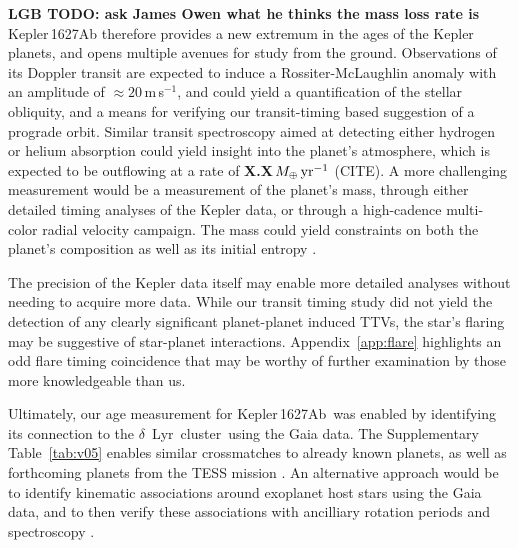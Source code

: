 \documentclass[12pt,modern,tighten]{aastex63}
\newcommand{\cn}{$\delta$~Lyr\ cluster} %
\newcommand{\pn}{Kepler\,1627Ab} %
\newcommand{\ms}{\,m\,s$^{-1}$}
\begin{document}


{\bf LGB TODO: ask James Owen what he thinks the mass loss rate is}
Kepler\,1627Ab therefore provides a new extremum in the ages of the
Kepler planets, and opens multiple avenues for study from the ground.
Observations of its Doppler transit are expected to induce a
Rossiter-McLaughlin anomaly with an amplitude of $\approx 20$\ms, and
could yield a quantification of the stellar obliquity, and a means for
verifying our transit-timing based suggestion of a prograde orbit.
Similar transit spectroscopy aimed at detecting either hydrogen or
helium absorption could yield insight into the planet's atmosphere,
which is expected to be outflowing at a rate of {\bf
X.X}\,$M_\oplus\,{\rm yr}^{-1}$ (CITE).  A more challenging
measurement would be a measurement of the planet's mass, through
either detailed timing analyses of the Kepler data, or through a
high-cadence multi-color radial velocity campaign.  The mass could
yield constraints on both the planet's composition as well as its
initial entropy \citep{owen_constraining_2020}.

The precision of the Kepler data itself may enable more detailed
analyses without needing to acquire more data.  While our transit
timing study did not yield the detection of any clearly significant
planet-planet induced TTVs, the star's flaring may be suggestive of
star-planet interactions.  Appendix~\ref{app:flare} highlights an odd flare
timing coincidence that may be worthy of further examination by those
more knowledgeable than us.

Ultimately, our age measurement for \pn\ was enabled by identifying
its connection to the \cn\ using the Gaia data.  The Supplementary
Table~\ref{tab:v05} enables similar crossmatches to already known
planets, as well as forthcoming planets from the TESS mission
\citep{ricker_transiting_2015,guerrero_tess_2021}.  An alternative
approach would be to identify kinematic associations around exoplanet
host stars using the Gaia data, and to then verify these associations
with ancilliary rotation periods and spectroscopy
\citep{tofflemire_tess_2021}.


\end{document}
